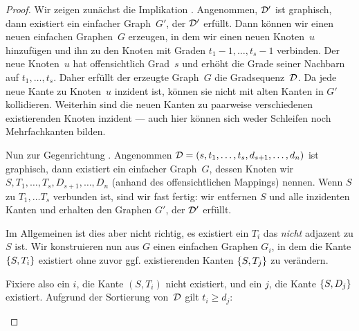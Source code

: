\begin{proof}
    Wir  zeigen zunächst die Implikation .
    Angenommen, $\degseq'$ ist graphisch, dann existiert ein einfacher Graph~$G'$, der $\degseq'$ erfüllt.
    Dann können wir einen neuen einfachen Graphen~$G$ erzeugen, in dem wir einen neuen Knoten~$u$ hinzufügen und ihn zu den Knoten mit Graden $t_1{-}1, \ldots, t_s{-}1$ verbinden.
    Der neue Knoten~$u$ hat offensichtlich Grad~$s$ und erhöht die Grade seiner Nachbarn auf $t_1, \ldots, t_s$.
    Daher erfüllt der erzeugte Graph~$G$ die Gradsequenz~$\degseq$.
    Da jede neue Kante zu Knoten~$u$ inzident ist, können sie nicht mit alten Kanten in $G'$ kollidieren.
    Weiterhin sind die neuen Kanten zu paarweise verschiedenen existierenden Knoten inzident --- auch hier können sich weder Schleifen noch Mehrfachkanten bilden.

    Nun  zur Gegenrichtung .
    Angenommen $\degseq = (s, t_1, \ldots, t_s, d_{s+1}, \ldots, d_n)$ ist graphisch, dann existiert ein einfacher Graph~$G$, dessen Knoten wir $S, T_1, \ldots, T_s, D_{s+1}, \ldots, D_n$ (anhand des offensichtlichen Mappings) nennen.
    Wenn $S$ zu $T_1, \ldots T_s$ verbunden ist, sind wir fast fertig: wir entfernen $S$ und alle inzidenten Kanten und erhalten den Graphen $G'$, der $\degseq'$ erfüllt.

    Im Allgemeinen ist dies aber nicht richtig, \dh es existiert ein $T_i$ das \emph{nicht} adjazent zu $S$ ist.
    Wir konstruieren nun aus $G$ einen einfachen Graphen $G_i$, in dem die Kante $\set{S, T_i}$ existiert ohne zuvor ggf. existierenden Kanten $\set{S, T_j}$ zu verändern.

    Fixiere also ein $i$, \sd die Kante $(S, T_i)$ nicht existiert, und ein $j$, \sd die Kante $\set{S, D_j}$ existiert.
    Aufgrund der Sortierung von~$\degseq$ gilt $t_i \ge d_j$:
    \begin{figure}
        \begin{center}
            \begin{tikzpicture}[
                    node distance=4em,
                    node/.style={draw, inner sep=0, minimum width=1.5em, minimum height=1.5em, circle},
                    edge/.style={draw, thick, black},
                    nonedge/.style={draw, dashed, red},
                ]


\end{tikzpicture}
\end{center}
\end{figure}
\end{proof}
